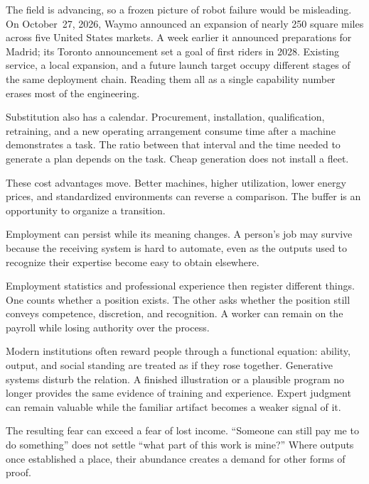The field is advancing, so a frozen picture of robot failure would be misleading. On October~27, 2026, Waymo announced an expansion of nearly 250 square miles across five United States markets. A week earlier it announced preparations for Madrid; its Toronto announcement set a goal of first riders in 2028.\cite{waymo2026expansion,waymo2026madrid,waymo2026toronto} Existing service, a local expansion, and a future launch target occupy different stages of the same deployment chain. Reading them all as a single capability number erases most of the engineering.



Substitution also has a calendar. Procurement, installation, qualification, retraining, and a new operating arrangement consume time after a machine demonstrates a task. The ratio between that interval and the time needed to generate a plan depends on the task. Cheap generation does not install a fleet.

These cost advantages move. Better machines, higher utilization, lower energy prices, and standardized environments can reverse a comparison. The buffer is an opportunity to organize a transition.


Employment can persist while its meaning changes. A person's job may survive because the receiving system is hard to automate, even as the outputs used to recognize their expertise become easy to obtain elsewhere.

Employment statistics and professional experience then register different things. One counts whether a position exists. The other asks whether the position still conveys competence, discretion, and recognition. A worker can remain on the payroll while losing authority over the process.

Modern institutions often reward people through a functional equation: ability, output, and social standing are treated as if they rose together. Generative systems disturb the relation. A finished illustration or a plausible program no longer provides the same evidence of training and experience. Expert judgment can remain valuable while the familiar artifact becomes a weaker signal of it.

The resulting fear can exceed a fear of lost income. “Someone can still pay me to do something” does not settle “what part of this work is mine?” Where outputs once established a place, their abundance creates a demand for other forms of proof.

